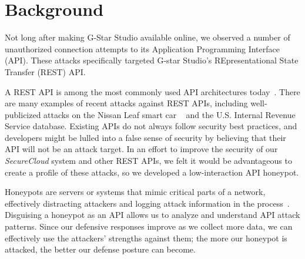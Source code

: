 
\section{Background} \label{background}

Not long after making G-Star Studio available online, we observed a number of unauthorized connection attempts to its Application Programming Interface (API).  
These attacks specifically targeted G-star Studio's REpresentational State Transfer (REST) API.

A REST API is among the most commonly used API architectures today~\cite{REST-API-use}.
There are many examples of recent attacks against REST APIs, including well-publicized attacks on the Nissan Leaf smart car
~\cite{Nissan-Leaf} 
and the U.S. Internal Revenue Service database.
Existing APIs do not always follow security best practices, and developers might be lulled into a false sense of security by believing that their API will not be an attack target.  
In an effort to improve the security of our {\em SecureCloud} system and other REST APIs, we felt it would be advantageous to create a profile of these attacks, so we developed a low-interaction API honeypot.


Honeypots are servers or systems that mimic critical parts of a network, effectively distracting attackers and logging attack information in the process~\cite{honeypot-Def}.
Disguising a honeypot as an API allows us to analyze and understand API attack patterns.
Since our defensive responses improve as we collect more data, we can effectively use the attackers' strengths against them; the more our honeypot is attacked, the better our defense posture can become.

